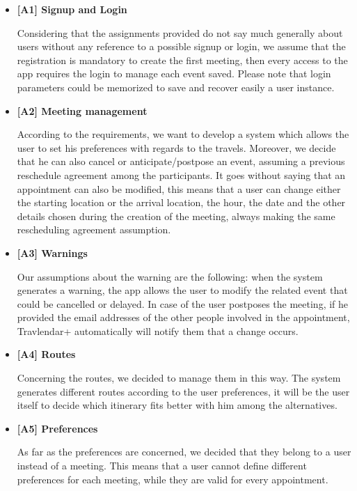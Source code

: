 
\begin{itemize}

\item \textbf{[A1] Signup and Login}

Considering that the assignments provided do not say much generally about users without any reference to a possible signup or login, we assume that the registration is mandatory to create the first meeting, then every access to the app requires the login to manage each event saved. Please note that login parameters could be memorized to save and recover easily a user instance.

\item \textbf{[A2] Meeting management}

According to the requirements, we want to develop a system which allows the user to set his preferences with regards to the travels. Moreover, we decide that he can also cancel or anticipate/postpose an event, assuming a previous reschedule agreement among the participants. It goes without saying that an appointment can also be modified, this means that a user can change either the starting location or the arrival location, the hour, the date and the other details chosen during the creation of the meeting, always making the same rescheduling agreement assumption. 

\item \textbf{[A3] Warnings}

Our assumptions about the warning are the following: when the system generates a warning, the app allows the user to modify the related event that could be cancelled or delayed. In case of the user postposes the meeting, if he provided the email addresses of the other people involved in the appointment, Travlendar+ automatically will notify them that a change occurs. 

\item \textbf{[A4] Routes}

Concerning the routes, we decided to manage them in this way. 
The system generates different routes according to the user preferences, it will be the user itself to decide which itinerary fits better with him among the alternatives. 

\item \textbf{[A5] Preferences}

As far as the preferences are concerned, we decided that they belong to a user instead of a meeting. This means that a user cannot define different preferences for each meeting, while they are valid for every appointment.

\end{itemize}

 
